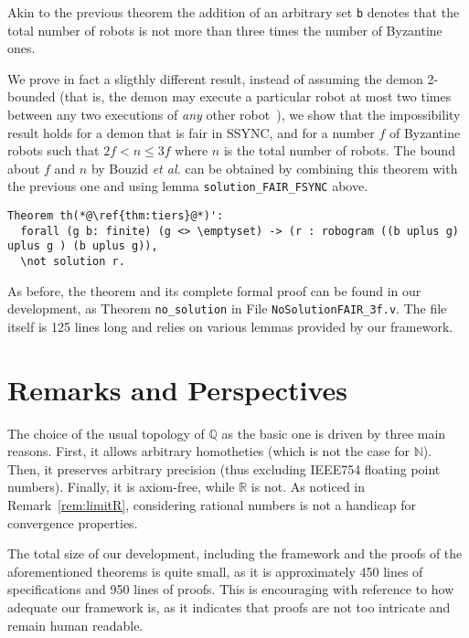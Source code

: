 \documentclass[11pt,a4]{llncs}
\newcommand{\x}{\xspace}
\newcommand{\setQ}{\ensuremath{\mathbb{Q}}\x}
\begin{document}
Akin to the previous
theorem the addition of an arbitrary
set \texttt{b} denotes that the total number of robots is not more
than three times the number of Byzantine ones.

We prove in fact a sligthly different result, instead of assuming
the demon 2-bounded (that is, the demon may execute a particular robot at
most two times between any two executions of \emph{any} other
robot~\cite{DT11r}), we show that the impossibility result holds for a
demon that is fair in SSYNC,
and for a number $f$ of
Byzantine robots such that $2f < n \leq 3f$ where $n$ is the total
number of robots. The bound about $f$ and $n$ by Bouzid \emph{et al.} 
can be obtained by
combining this theorem with the previous one and using lemma
\texttt{\small solution\_FAIR\_FSYNC} above.

\begin{lstlisting}
Theorem th(*@\ref{thm:tiers}@*)': 
  forall (g b: finite) (g <> \emptyset) -> (r : robogram ((b uplus g) uplus g ) (b uplus g)), 
  \not solution r.
\end{lstlisting}


As before, the theorem and its complete formal proof can be found in our
development, as Theorem \lstinline!no_solution! in File
\lstinline!NoSolutionFAIR_3f.v!. The file itself is 125 lines long
and relies on various lemmas provided by our
framework.

\section{Remarks and Perspectives}
\label{sec:concl}

The choice of the usual topology of $\setQ$ as the basic one is driven
by three main reasons. First, it allows arbitrary homotheties (which is not
the case for $\mathbb{N}$). Then, it preserves arbitrary precision
(thus excluding \textsc{IEEE754} floating point numbers). Finally, it
is axiom-free, while $\mathbb{R}$ is not. As noticed in
Remark~\ref{rem:limitR}, considering rational numbers is not a handicap
for convergence properties.

The total size of our development, including the framework and the
proofs of the aforementioned theorems is quite small, as it is
approximately 450 lines of specifications and 950 lines of proofs. This
is encouraging with reference to how adequate our framework is, as it
indicates that proofs are not too intricate and remain human readable.
\end{document}
